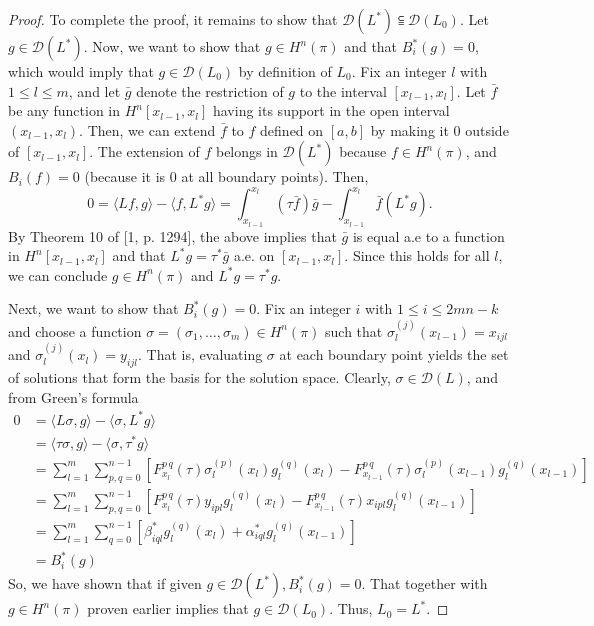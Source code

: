 \documentclass[11pt,reqno,oneside,a4paper]{article}
\begin{document}
\begin{proof}
		To complete the proof, it remains to show that $\mathcal{D}(L^*) \subseteqq \mathcal{D}(L_0)$. Let $g \in \mathcal{D}(L^*)$. Now, we want to show that $g \in H^n(\pi)$ and that $B_i^*(g) = 0$, which would imply that $g \in \mathcal{D}(L_0)$ by definition of $L_0$. Fix an integer $l$ with $1 \leq l \leq m$, and let $\bar{g}$ denote the restriction of $g$ to the interval $[x_{l-1}, x_l].$ Let $\bar{f}$ be any function in $H^n[x_{l-1},x_l]$ having its support in the open interval $(x_{l-1},x_l)$. 
		Then, we can extend $\bar{f}$ to $f$ defined on $[a,b]$ by making it 0 outside of $[x_{l-1},x_l]$. The extension of $f$ belongs in $\mathcal{D}(L^*)$ because $f \in H^n(\pi)$, and $B_i(f) = 0$ (because it is 0 at all boundary points). Then,
		$$ 0 = \langle Lf,g\rangle - \langle f, L^*g\rangle = \int_{x_{l-1}}^{x_l}(\tau\bar{f})\bar{g} - \int_{x_{l-1}}^{x_l}\bar{f}(L^*g).$$
		By Theorem 10 of [1, p. 1294], the above implies that $\bar{g}$ is equal a.e to a function in $H^n[x_{l-1},x_l]$ and that $L^*g = \tau^*\bar{g}$ a.e. on $[x_{l-1},x_l]$. Since this holds for all $l$, we can conclude $g\in H^n(\pi)$ and $L^*g=\tau^*g$. 
		
		Next, we want to show that $B_i^*(g) = 0$. Fix an integer $i$ with $1\leq i \leq 2mn-k$ and choose a function $\sigma = (\sigma_1,\dots, \sigma_m) \in H^n(\pi)$ such that $\sigma_l^{(j)}(x_{l-1}) = x_{ijl}$ and $\sigma_l^{(j)}(x_{l}) = y_{ijl}$. That is, evaluating $\sigma$ at each boundary point yields the set of solutions that form the basis for the solution space. Clearly, $\sigma \in \mathcal{D}(L)$, and from Green's formula
		\begin{align*}
		     0 &= \langle L\sigma,g\rangle - \langle \sigma, L^*g\rangle\\
		     &= \langle \tau\sigma,g\rangle - \langle \sigma, \tau^*g\rangle\\
		     &= \sum_{l=1}^{m}\sum_{p,q=0}^{n-1}[F_{x_l}^{p\,q}(\tau)\sigma_l^{(p)}(x_l)g_l^{(q)}(x_l)
		     - F_{x_{l-1}}^{p\,q}(\tau)\sigma_l^{(p)}(x_{l-1})g_l^{(q)}(x_{l-1})]\\
		     &= \sum_{l=1}^{m}\sum_{p,q=0}^{n-1}[F_{x_l}^{p\,q}(\tau)y_{ipl}g_l^{(q)}(x_l)
		     - F_{x_{l-1}}^{p\,q}(\tau)x_{ipl}g_l^{(q)}(x_{l-1})]\\
		     &= \sum_{l=1}^{m}\sum_{q=0}^{n-1}[\beta_{iql}^*g_l^{(q)}(x_l) + \alpha_{iql}^*g_l^{(q)}(x_{l-1})]\\
		     &= B_i^*(g) 
		\end{align*}
		So, we have shown that if given $g \in \mathcal{D}(L^*), B_i^*(g) = 0$. That together with $g \in H^n(\pi)$ proven earlier implies that $g \in \mathcal{D}(L_0)$. Thus, $L_0 = L^*$.
	\end{proof}

    
\end{document}
